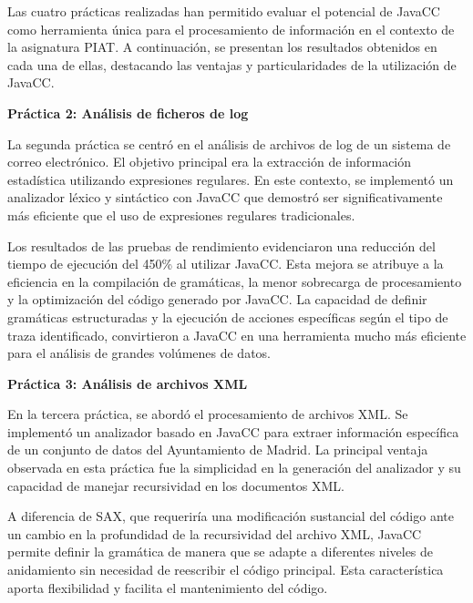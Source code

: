 Las cuatro prácticas realizadas han permitido evaluar el potencial de JavaCC como herramienta única para el procesamiento de información en el contexto de la asignatura PIAT. A continuación, se presentan los resultados obtenidos en cada una de ellas, destacando las ventajas y particularidades de la utilización de JavaCC.

\phantom{text}

\noindent \textbf{Práctica 2: Análisis de ficheros de log}

\phantom{text}


La segunda práctica se centró en el análisis de archivos de log de un sistema de correo electrónico. El objetivo principal era la extracción de información estadística utilizando expresiones regulares. En este contexto, se implementó un analizador léxico y sintáctico con JavaCC que demostró ser significativamente más eficiente que el uso de expresiones regulares tradicionales.

Los resultados de las pruebas de rendimiento evidenciaron una reducción del tiempo de ejecución del 450\% al utilizar JavaCC. Esta mejora se atribuye a la eficiencia en la compilación de gramáticas, la menor sobrecarga de procesamiento y la optimización del código generado por JavaCC. La capacidad de definir gramáticas estructuradas y la ejecución de acciones específicas según el tipo de traza identificado, convirtieron a JavaCC en una herramienta mucho más eficiente para el análisis de grandes volúmenes de datos.

\phantom{text}

\noindent \textbf{Práctica 3: Análisis de archivos XML}

\phantom{text}

En la tercera práctica, se abordó el procesamiento de archivos XML. Se implementó un analizador basado en JavaCC para extraer información específica de un conjunto de datos del Ayuntamiento de Madrid. La principal ventaja observada en esta práctica fue la simplicidad en la generación del analizador y su capacidad de manejar recursividad en los documentos XML.

A diferencia de SAX, que requeriría una modificación sustancial del código ante un cambio en la profundidad de la recursividad del archivo XML, JavaCC permite definir la gramática de manera que se adapte a diferentes niveles de anidamiento sin necesidad de reescribir el código principal. Esta característica aporta flexibilidad y facilita el mantenimiento del código.

\phantom{text}

